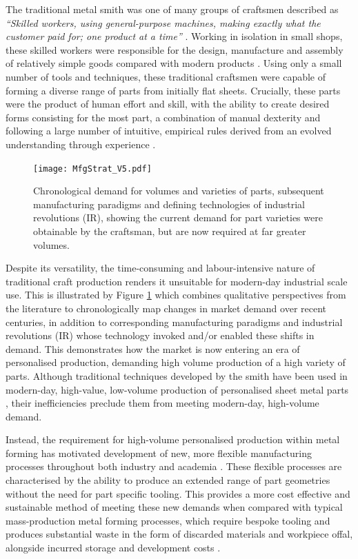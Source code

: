 The traditional metal smith was one of many groups of craftsmen described as \textit{``Skilled workers, using general-purpose machines, making exactly what the customer paid for; one product at a time''} \citep{Koren2010TheRevolution}. Working in isolation in small shops, these skilled workers were responsible for the design, manufacture and assembly of relatively simple goods compared with modern products \citep{Groover2015AutomationEdition}.  Using only a small number of tools and techniques, these traditional craftsmen were capable of forming a diverse range of parts from initially flat sheets. Crucially, these parts were the product of human effort and skill, with the ability to create desired forms consisting for the most part, a combination of manual dexterity and following a large number of intuitive, empirical rules derived from an evolved understanding through experience \citep{Hall1961EngineeringRevolution}. 

\begin{figure}[h]
	\centering
	\texttt{[image: MfgStrat\_V5.pdf]}
	\caption{Chronological demand for volumes and varieties of parts, subsequent manufacturing paradigms and defining technologies of industrial revolutions (IR), showing the current demand for part varieties were obtainable by the craftsman, but are now required at far greater volumes.}
	\label{fig:VarietyVolume}
\end{figure}

Despite its versatility, the time-consuming and labour-intensive nature of traditional craft production renders it unsuitable for modern-day industrial scale use. This is illustrated by Figure \ref{fig:VarietyVolume} which combines qualitative perspectives from the literature \citep{Koren2010TheRevolution,Popkova2019FundamentalRevolutions,Mourtzis2012DecentralizedOutlook,Mourtzis2014TheCustomisation} to chronologically map changes in market demand over recent centuries, in addition to corresponding manufacturing paradigms and industrial revolutions (IR) whose technology invoked  and/or enabled these shifts in demand. This demonstrates how the market is now entering an era of personalised production, demanding high volume production of a high variety of parts. Although traditional techniques developed by the smith have been used in modern-day, high-value, low-volume production of personalised sheet metal parts \citep{Amos2015Bloodhoundfeathers}, their inefficiencies preclude them from meeting modern-day, high-volume demand.

Instead, the requirement for high-volume personalised production within metal forming has motivated development of new, more flexible manufacturing processes throughout both industry and academia \citep{Allwood2006AJapan,Yang2018FlexibilityForming}. These flexible processes are characterised by the ability to produce an extended range of part geometries without the need for part specific tooling. This provides a more cost effective and sustainable method of meeting these new demands when compared with typical mass-production metal forming processes, which require bespoke tooling and produces substantial waste in the form of discarded materials and workpiece offal, alongside incurred storage and development costs \citep{Cooper2017TheProcesses,Horton2019ImplementingComponents}. 

